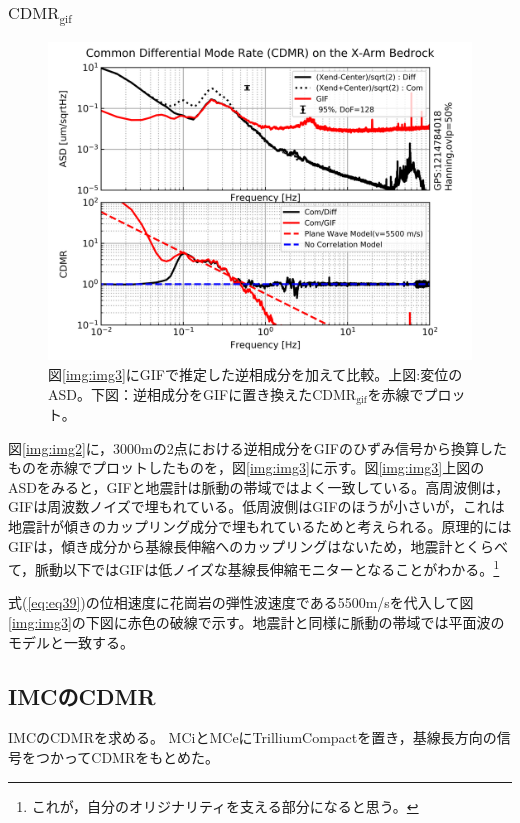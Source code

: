 \subsubsection{$\mathrm{CDMR_{gif}}$}
\begin{figure}[H]
  \begin{center}
    \includegraphics[width=11.5cm]{./cmrr_xarm_gif.png}
  \end{center}
  \caption{図\ref{img:img3}にGIFで推定した逆相成分を加えて比較。上図:変位のASD。下図：逆相成分をGIFに置き換えた$\mathrm{CDMR_{gif}}$を赤線でプロット。
  }\label{img:img4}
\end{figure}


図\ref{img:img2}に，3000mの2点における逆相成分をGIFのひずみ信号から換算したものを赤線でプロットしたものを，図\ref{img:img3}に示す。図\ref{img:img3}上図のASDをみると，GIFと地震計は脈動の帯域ではよく一致している。高周波側は，GIFは周波数ノイズで埋もれている。低周波側はGIFのほうが小さいが，これは地震計が傾きのカップリング成分で埋もれているためと考えられる。原理的にはGIFは，傾き成分から基線長伸縮へのカップリングはないため，地震計とくらべて，脈動以下ではGIFは低ノイズな基線長伸縮モニターとなることがわかる。\footnote[11]{これが，自分のオリジナリティを支える部分になると思う。}

式(\ref{eq:eq39})の位相速度に花崗岩の弾性波速度である5500m/sを代入して図\ref{img:img3}の下図に赤色の破線で示す。地震計と同様に脈動の帯域では平面波のモデルと一致する。


\subsection{IMCのCDMR}
IMCのCDMRを求める。%
MCiとMCeにTrilliumCompactを置き，基線長方向の信号をつかってCDMRをもとめた。


